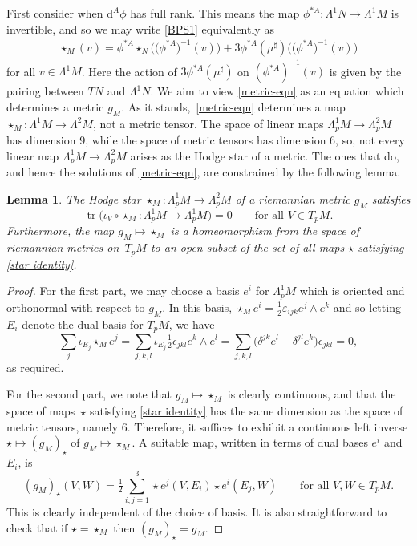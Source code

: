 \documentclass[10pt,a4paper]{amsart}
\newcommand{\1}{{\mathbb{1}}}
\def \d{\mathrm{d}}
\newcommand{\tr}{{\operatorname{tr}}}
\numberwithin{equation}{section}
\newtheorem{Lemma}[Theorem]{Lemma}
\begin{document}
First consider when $\d^A\phi$ has full rank. This means the map $\phi^{\ast A}\colon \Lambda^1N\to\Lambda^1M$ is invertible, and so we may write \eqref{BPS1} equivalently as
\begin{align}\label{metric-eqn}
 \star_{M}(v)=\phi^{\ast A}\star_{N}\big(\big(\phi^{\ast A}\big)^{-1}(v)\big)+3\phi^{\ast A}(\mu^\sharp)\big(\big(\phi^{\ast A}\big)^{-1}(v)\big)
\end{align}
for all $v\in\Lambda^1M$. Here the action of $3\phi^{\ast A}(\mu^\sharp)$ on $(\phi^{\ast A})^{-1}(v)$ is given by the pairing between $TN$ and $\Lambda^1N$. We aim to view \eqref{metric-eqn} as an equation which determines a metric $g_M$. As it stands,~\eqref{metric-eqn} determines a map $\star_{M}\colon \Lambda^1M\to\Lambda^2M$, not a metric tensor. The space of linear maps $\Lambda_p^1M\to\Lambda_p^2M$ has dimension 9, while the space of metric tensors has dimension 6, so, not every linear map $\Lambda_p^1M\to\Lambda_p^2M$ arises as the Hodge star of a metric. The ones that do, and hence the solutions of \eqref{metric-eqn}, are constrained by the following lemma.
\begin{Lemma}\label{lem:star-constraint}
The Hodge star $\star_{M}\colon \Lambda^1_pM\to\Lambda^2_pM$ of a riemannian metric $g_M$ satisfies
\begin{equation}
\label{star identity}
\tr\bigl(\iota_V\circ\star_M\colon \Lambda^1_pM\to\Lambda^1_pM\bigr)=0\qquad\text{for all }V\in T_pM.
\end{equation}
Furthermore, the map $g_M\mapsto \star_{M}$ is a homeomorphism from the space of riemannian metrics on~$T_pM$ to an open subset of the set of all maps $\star$ satisfying \eqref{star identity}.
\end{Lemma}
\begin{proof}
For the first part, we may choose a basis $e^i$ for $\Lambda^1_pM$ which is oriented and orthonormal with respect to $g_M$. In this basis, $\star_{M}e^i=\frac12 \varepsilon_{ijk}e^j\wedge e^k$ and so letting $E_i$ denote the dual basis for $T_pM$, we have{\samepage
\begin{equation*}
\sum_j \iota_{E_j}\star_{M} e^j = \sum_{j,k,l}\iota_{E_j} \tfrac{1}{2}\epsilon_{jkl}e^k\wedge e^l=\sum_{j,k,l}\big(\delta^{jk}e^l-\delta^{jl}e^k\big)\epsilon_{jkl}=0,
\end{equation*}
as required.}

For the second part, we note that $g_M\mapsto \star_{M}$ is clearly continuous, and that the space of maps~$\star$ satisfying \eqref{star identity} has the same dimension as the space of metric tensors, namely $6$. Therefore, it suffices to exhibit a continuous left inverse $\star\mapsto (g_M)_\star$ of $g_M\mapsto \star_{M}$. A suitable map, written in terms of dual bases $e^i$ and $E_i$, is
\begin{equation}\label{recover-metric}
(g_M)_\star(V,W) = \tfrac12 \sum_{i,j=1}^3 \star e^j(V,E_i)\star e^i(E_j,W)\qquad \text{for all } V,W\in T_pM.
\end{equation}
This is clearly independent of the choice of basis. It is also straightforward to check that if $\star=\star_{M}$ then $(g_M)_\star = g_M$.
\end{proof}
\end{document}
